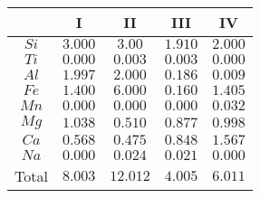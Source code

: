 \begin{tabular}{c c c c c }
     \hline 
     & \textbf{I} & \textbf{II} & \textbf{III} & \textbf{IV} \\
     \hline
       $Si$ & $3.000$ & $3.00$ & $1.910$ & $2.000$\\
       $Ti$ & $0.000$ & $0.003$ & $0.003$ & $0.000$\\
       $Al$ & $1.997$ & $2.000 $ & $0.186$ & $0.009$\\
       $Fe$ & $1.400$ & $6.000$ & $0.160$ & $1.405$\\
       $Mn$ & $0.000$ & $0.000$ & $0.000 $ & $0.032$\\
       $Mg$ & $1.038$ & $0.510$ & $0.877$ & $0.998$\\
       $Ca$ & $0.568$ & $0.475$ & $0.848$ & $1.567$\\
       $Na$ & $0.000$ & $0.024$ & $0.021$ & $0.000$\\
       Total & $8.003$ & $12.012$ & $4.005$ & $6.011$\\
    \hline 
\end{tabular}